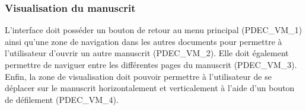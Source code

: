 \subsubsection{Visualisation du manuscrit}

L’interface doit posséder un bouton de retour au menu principal (PDEC_VM_1) ainsi qu’une zone de navigation dans les autres documents pour permettre à l’utilisateur d’ouvrir un autre manuscrit (PDEC_VM_2). Elle doit également permettre de naviguer entre les différentes pages du manuscrit (PDEC_VM_3). Enfin, la zone de visualisation doit pouvoir permettre à l’utilisateur de se déplacer sur le manuscrit horizontalement et verticalement à l’aide d’un bouton de défilement (PDEC_VM_4).




